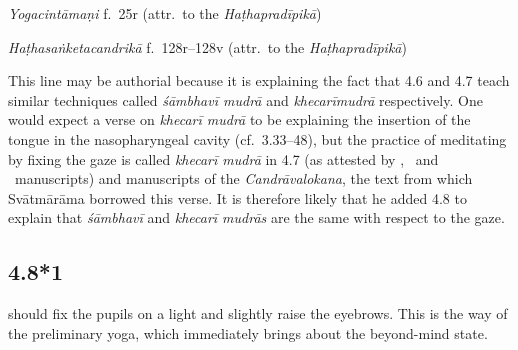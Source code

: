 \begin{ekdosis}
\begin{testimonia}[hp04_008]
\emph{Yogacintāmaṇi} f.~25r (attr.~to the \emph{Haṭhapradīpikā})
\begin{versinnote}
\end{versinnote}

\emph{Haṭhasaṅketacandrikā} f.~128r–128v (attr.~to the \emph{Haṭhapradīpikā})
\begin{versinnote}
\tl{\var{unnamayed ] 2244, saṃcālayed B220}\\+}
\tl{\var{unmanīkaraṇaṃ kṣaṇāt ] 2244, unmanīkāralakṣaṇam B220}\\+}
\tl{\var{tu labhed ataḥ ] 2244, labhate daśa B220}\\!}
\end{versinnote}

\end{testimonia}

\begin{philcomm}[hp04_008]
This line may be authorial because it is explaining the fact that 4.6 and 4.7 teach similar techniques called \emph{śāmbhavī mudrā} and \emph{khecarīmudrā} respectively. One would expect a verse on \emph{khecarī mudrā} to be explaining the insertion of the tongue in the nasopharyngeal cavity (cf.~3.33–48), but the practice of meditating by fixing the gaze is called \emph{khecarī mudrā} in 4.7 (as attested by \textalpha, \textbeta\ and \texteta\ manuscripts) and manuscripts of the \emph{Candrāvalokana}, the text from which Svātmārāma borrowed this verse. It is therefore likely that he added 4.8 to explain that \emph{śāmbhavī} and \emph{khecarī mudrās} are the same with respect to the gaze. 

\end{philcomm}

\subsection*{4.8*1}
\begin{translation} should fix the pupils on a light and slightly raise the eyebrows. This is the way of the preliminary yoga, which immediately brings about the beyond-mind state.
\end{translation}


\end{ekdosis}
